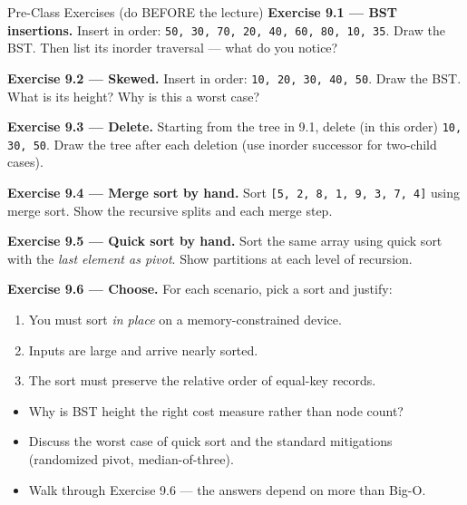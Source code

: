 \documentclass[11pt]{article}
\begin{document}
\begin{exbox}{Pre-Class Exercises (do BEFORE the lecture)}
\textbf{Exercise 9.1 --- BST insertions.} Insert in order: \verb|50, 30, 70, 20, 40, 60, 80, 10, 35|. Draw the BST. Then list its inorder traversal --- what do you notice?

\textbf{Exercise 9.2 --- Skewed.} Insert in order: \verb|10, 20, 30, 40, 50|. Draw the BST. What is its height? Why is this a worst case?

\textbf{Exercise 9.3 --- Delete.} Starting from the tree in 9.1, delete (in this order) \verb|10, 30, 50|. Draw the tree after each deletion (use inorder successor for two-child cases).

\textbf{Exercise 9.4 --- Merge sort by hand.} Sort \verb|[5, 2, 8, 1, 9, 3, 7, 4]| using merge sort. Show the recursive splits and each merge step.

\textbf{Exercise 9.5 --- Quick sort by hand.} Sort the same array using quick sort with the \emph{last element as pivot}. Show partitions at each level of recursion.

\textbf{Exercise 9.6 --- Choose.} For each scenario, pick a sort and justify:
\begin{enumerate}[label=(\alph*)]
  \item You must sort \emph{in place} on a memory-constrained device.
  \item Inputs are large and arrive nearly sorted.
  \item The sort must preserve the relative order of equal-key records.
\end{enumerate}
\end{exbox}

\begin{disbox}
\begin{itemize}[leftmargin=*]
  \item Why is BST height the right cost measure rather than node count?
  \item Discuss the worst case of quick sort and the standard mitigations (randomized pivot, median-of-three).
  \item Walk through Exercise 9.6 --- the answers depend on more than Big-O.
\end{itemize}
\end{disbox}
\end{document}
